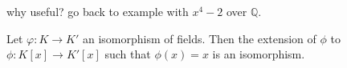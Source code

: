 \documentclass[12pt]{article}
\newenvironment{theorem}[2][Theorem]{\begin{trivlist}
    \item[\hskip \labelsep {\bfseries #1}\hskip \labelsep {\bfseries #2.}]}{\end{trivlist}}
\newenvironment{example}[1][Example]{\begin{trivlist}
    \item[\hskip \labelsep {\bfseries #1:}]}{\end{trivlist}}
\begin{document}
\begin{example}
    why useful? go back to example with $x^4 - 2$ over $\mathbb{Q}$. 
\end{example}

\begin{theorem}{galois lemma 2}
    Let $\varphi : K \rightarrow K'$ an isomorphism of fields. Then the extension of $\phi$ to $\phi: K[x] \rightarrow K'[x]$ such that $\phi(x) = x$ is an isomorphism.
\end{theorem}
\end{document}
